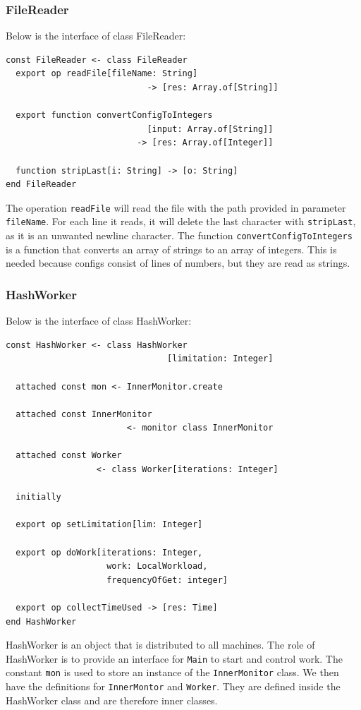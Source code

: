 

\clearpage
\subsubsection{FileReader}
Below is the interface of class FileReader:
\begin{lstlisting}[language=emerald]
const FileReader <- class FileReader
  export op readFile[fileName: String] 
                            -> [res: Array.of[String]]
                            
  export function convertConfigToIntegers
                            [input: Array.of[String]] 
                          -> [res: Array.of[Integer]]
                            
  function stripLast[i: String] -> [o: String]
end FileReader
\end{lstlisting}
The operation \verb|readFile| will read the file with the path provided in parameter \verb|fileName|. For each line it reads, it will delete the last character with \verb|stripLast|, as it is an unwanted newline character. The function \verb|convertConfigToIntegers| is a function that converts an array of strings to an array of integers. This is needed because configs consist of lines of numbers, but they are read as strings.



\subsubsection{HashWorker}
Below is the interface of class HashWorker:
\begin{lstlisting}[language=emerald]
const HashWorker <- class HashWorker
                                [limitation: Integer]

  attached const mon <- InnerMonitor.create

  attached const InnerMonitor 
                        <- monitor class InnerMonitor

  attached const Worker
                  <- class Worker[iterations: Integer]

  initially

  export op setLimitation[lim: Integer]
  
  export op doWork[iterations: Integer, 
                    work: LocalWorkload, 
                    frequencyOfGet: integer]

  export op collectTimeUsed -> [res: Time]
end HashWorker
\end{lstlisting}
HashWorker is an object that is distributed to all machines. The role of HashWorker is to provide an interface for \verb|Main| to start and control work. The constant \verb|mon| is used to store an instance of the \verb|InnerMonitor| class. We then have the definitions for \verb|InnerMontor| and \verb|Worker|. They are defined inside the HashWorker class and are therefore inner classes.

